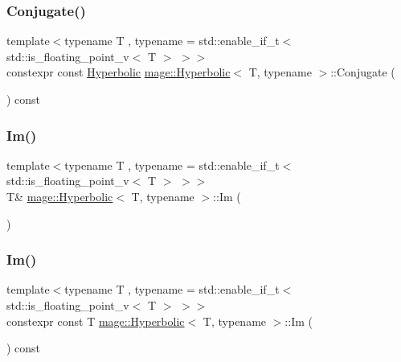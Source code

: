 \subsubsection{\texorpdfstring{Conjugate()}{Conjugate()}}
{\footnotesize\ttfamily template$<$typename T , typename  = std\+::enable\+\_\+if\+\_\+t$<$ std\+::is\+\_\+floating\+\_\+point\+\_\+v$<$ T $>$ $>$$>$ \\
constexpr const \mbox{\hyperlink{structmage_1_1_hyperbolic}{Hyperbolic}} \mbox{\hyperlink{structmage_1_1_hyperbolic}{mage\+::\+Hyperbolic}}$<$ T, typename $>$\+::Conjugate (\begin{DoxyParamCaption}{ }\end{DoxyParamCaption}) const\hspace{0.3cm}{\ttfamily [noexcept]}}

\mbox{\label{structmage_1_1_hyperbolic_a36ebff123d7654b33a0f584ef31a17d6}} 
\subsubsection{\texorpdfstring{Im()}{Im()}\hspace{0.1cm}{\footnotesize\ttfamily [1/2]}}
{\footnotesize\ttfamily template$<$typename T , typename  = std\+::enable\+\_\+if\+\_\+t$<$ std\+::is\+\_\+floating\+\_\+point\+\_\+v$<$ T $>$ $>$$>$ \\
T\& \mbox{\hyperlink{structmage_1_1_hyperbolic}{mage\+::\+Hyperbolic}}$<$ T, typename $>$\+::Im (\begin{DoxyParamCaption}{ }\end{DoxyParamCaption})\hspace{0.3cm}{\ttfamily [noexcept]}}

\mbox{\label{structmage_1_1_hyperbolic_a1d213f3c1688f064f11311728fef61c7}} 
\subsubsection{\texorpdfstring{Im()}{Im()}\hspace{0.1cm}{\footnotesize\ttfamily [2/2]}}
{\footnotesize\ttfamily template$<$typename T , typename  = std\+::enable\+\_\+if\+\_\+t$<$ std\+::is\+\_\+floating\+\_\+point\+\_\+v$<$ T $>$ $>$$>$ \\
constexpr const T \mbox{\hyperlink{structmage_1_1_hyperbolic}{mage\+::\+Hyperbolic}}$<$ T, typename $>$\+::Im (\begin{DoxyParamCaption}{ }\end{DoxyParamCaption}) const\hspace{0.3cm}{\ttfamily [noexcept]}}


